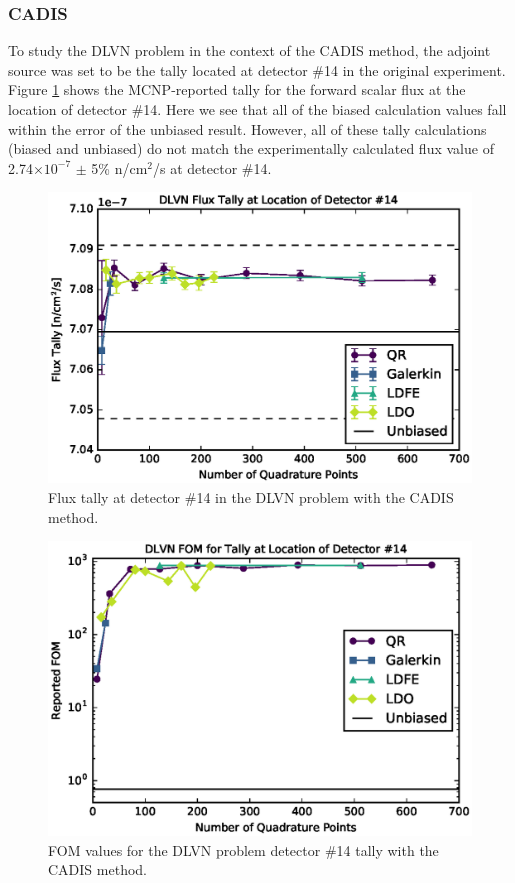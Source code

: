 \documentclass{article} %
\newcommand{\E}[1]{$\times10^{#1}$}
\begin{document}
\subsubsection{CADIS}

To study the DLVN problem in the context of the CADIS method, the adjoint
source was set to be the tally located at detector \#14 in the original
experiment. Figure \ref{dlvn-cad-tally} shows the MCNP-reported tally for the
forward scalar flux at the location of detector \#14. Here we see that all of
the biased calculation values fall within the error of the unbiased result.
However, all of these tally calculations (biased and unbiased) do not match
the experimentally calculated flux value of 2.74\E{-7} $\pm$ 5\% n/cm$^2$/s
at detector \#14.

\begin{figure}[!htb]
\centering
\includegraphics[max height=0.445\textheight]{img/dlvn-cadis-tally.eps}
\caption{Flux tally at detector \#14 in the DLVN problem with the CADIS method.}
\label{dlvn-cad-tally}
\end{figure}

\begin{figure}[!htb]
\centering
\includegraphics[max height=0.445\textheight]{img/dlvn-cadis-fom.eps}
\caption{FOM values for the DLVN problem detector \#14 tally with the CADIS 
         method.}
\label{dlvn-cad-fom}
\end{figure}
\end{document}
